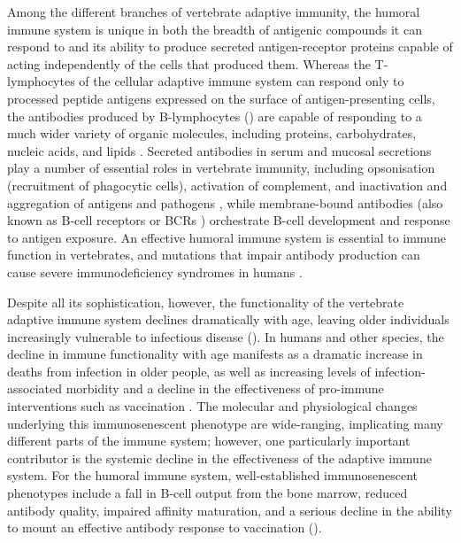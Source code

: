 Among the different branches of vertebrate adaptive immunity, the humoral immune system is unique in both the breadth of antigenic compounds it can respond to and its ability to produce secreted antigen-receptor proteins capable of acting independently of the cells that produced them. Whereas the T-lymphocytes of the cellular adaptive immune system can respond only to processed peptide antigens expressed on the surface of antigen-presenting cells, the antibodies produced by B-lymphocytes () are capable of responding to a much wider variety of organic molecules, including proteins, carbohydrates, nucleic acids, and lipids \parencite{sompayrac2019immune}. Secreted antibodies in serum and mucosal secretions play a number of essential roles in vertebrate immunity, including opsonisation (recruitment of phagocytic cells), activation of complement, and inactivation and aggregation of antigens and pathogens \parencite{schroeder2010immunoglobulins}, while membrane-bound antibodies (also known as B-cell receptors or BCRs \parencite{bengten2015fishantibodies}) orchestrate B-cell development and response to antigen exposure. An effective humoral immune system is essential to immune function in vertebrates, and mutations that impair antibody production can cause severe immunodeficiency syndromes in humans \parencite{vanzelm2006cd19}.

Despite all its sophistication, however, the functionality of the vertebrate adaptive immune system declines dramatically with age, leaving older individuals increasingly vulnerable to infectious disease (). In humans and other species, the decline in immune functionality with age manifests as a dramatic increase in deaths from infection in older people, as well as increasing levels of infection-associated morbidity and a decline in the effectiveness of pro-immune interventions such as vaccination \parencite{sambhara2009vaccination}. The molecular and physiological changes underlying this immunosenescent phenotype are wide-ranging, implicating many different parts of the immune system; however, one particularly important contributor is the systemic decline in the effectiveness of the adaptive immune system. For the humoral immune system, well-established immunosenescent phenotypes include a fall in \naive B-cell output from the bone marrow, reduced antibody quality, impaired affinity maturation, and a serious decline in the ability to mount an effective antibody response to vaccination ().

